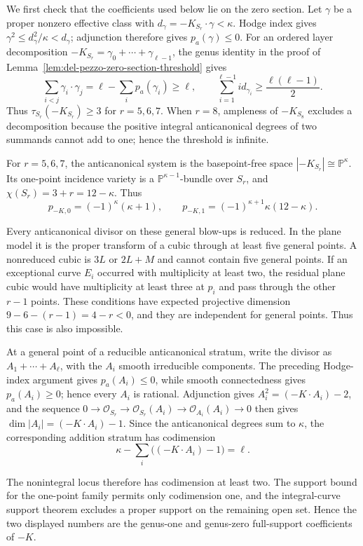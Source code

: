 \documentclass[11pt,reqno]{amsart}
\theoremstyle{definition}
\newcommand{\Pp}{\mathbb P}
\newcommand{\Ocal}{\mathcal O}
\begin{document}
We first check that the coefficients used below lie on the zero section.
Let $\gamma$ be a proper nonzero effective class with
$d_\gamma=-K_{S_r}\cdot\gamma<\kappa$.  Hodge index gives
$\gamma^2\le d_\gamma^2/\kappa<d_\gamma$; adjunction therefore gives
$p_a(\gamma)\le0$.  For an ordered layer decomposition
$-K_{S_r}=\gamma_0+\cdots+\gamma_{\ell-1}$, the genus identity in the proof
of Lemma~\ref{lem:del-pezzo-zero-section-threshold} gives
\[
 \sum_{i<j}\gamma_i\cdot\gamma_j
 =\ell-\sum_i p_a(\gamma_i)\ge\ell,
 \qquad
 \sum_{i=1}^{\ell-1}i d_{\gamma_i}
 \ge\frac{\ell(\ell-1)}2.
\]
Thus $\tau_{S_r}(-K_{S_r})\ge3$ for $r=5,6,7$.  When $r=8$,
ampleness of $-K_{S_8}$ excludes a decomposition because the positive
integral anticanonical degrees of two summands cannot add to one; hence the
threshold is infinite.

For \(r=5,6,7\), the anticanonical system is the basepoint-free space
\(|-K_{S_r}|\cong\Pp^\kappa\).  Its one-point incidence variety is a
\(\Pp^{\kappa-1}\)-bundle over \(S_r\), and
\(\chi(S_r)=3+r=12-\kappa\).  Thus
\[
 p_{-K,0}=(-1)^\kappa(\kappa+1),\qquad
 p_{-K,1}=(-1)^{\kappa+1}\kappa(12-\kappa).
\]

Every anticanonical divisor on these general blow-ups is reduced.  In the
plane model it is the proper transform of a cubic through at least five
general points.  A nonreduced cubic is $3L$ or $2L+M$ and cannot contain
five general points.  If an exceptional curve $E_i$ occurred with
multiplicity at least two, the residual plane cubic would have multiplicity
at least three at $p_i$ and pass through the other $r-1$ points.  These
conditions have expected projective dimension
$9-6-(r-1)=4-r<0$, and they are independent for general points.  Thus this
case is also impossible.

At a general point of a reducible anticanonical stratum, write the divisor as
$A_1+\cdots+A_\ell$, with the $A_i$ smooth irreducible components.  The
preceding Hodge-index argument gives $p_a(A_i)\le0$, while smooth
connectedness gives $p_a(A_i)\ge0$; hence every $A_i$ is rational.
Adjunction gives
$A_i^2=(-K\cdot A_i)-2$, and the sequence
$0\to\Ocal_{S_r}\to\Ocal_{S_r}(A_i)\to\Ocal_{A_i}(A_i)\to0$
then gives $\dim|A_i|=(-K\cdot A_i)-1$.  Since the anticanonical degrees
sum to $\kappa$, the corresponding addition stratum has codimension
\[
 \kappa-\sum_i\bigl((-K\cdot A_i)-1\bigr)=\ell.
\]

The nonintegral locus therefore has codimension at least two.  The support
bound for the one-point family permits only codimension one, and the
integral-curve support theorem excludes a proper support on the remaining
open set.  Hence the two displayed numbers are the genus-one and genus-zero
full-support coefficients of $-K$.
\end{document}
